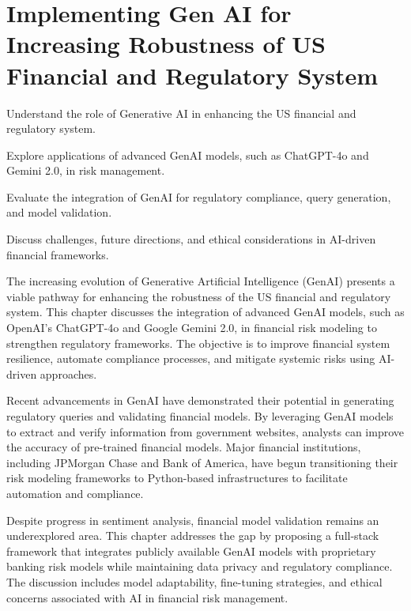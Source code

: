 \documentclass[a4paper,headinclude=on,footinclude=on,12pt,oneside]{scrbook}
\begin{document}
	
	\chapter{Implementing Gen AI for Increasing Robustness of US Financial and Regulatory System}
	
	\begin{arrows}
		\item Understand the role of Generative AI in enhancing the US financial and regulatory system.
		\item Explore applications of advanced GenAI models, such as ChatGPT-4o and Gemini 2.0, in risk management.
		\item Evaluate the integration of GenAI for regulatory compliance, query generation, and model validation.
		\item Discuss challenges, future directions, and ethical considerations in AI-driven financial frameworks.
	\end{arrows}
	
	The increasing evolution of Generative Artificial Intelligence (GenAI) presents a viable pathway for enhancing the robustness of the US financial and regulatory system. This chapter discusses the integration of advanced GenAI models, such as OpenAI’s ChatGPT-4o and Google Gemini 2.0, in financial risk modeling to strengthen regulatory frameworks. The objective is to improve financial system resilience, automate compliance processes, and mitigate systemic risks using AI-driven approaches.
	
	Recent advancements in GenAI have demonstrated their potential in generating regulatory queries and validating financial models. By leveraging GenAI models to extract and verify information from government websites, analysts can improve the accuracy of pre-trained financial models. Major financial institutions, including JPMorgan Chase and Bank of America, have begun transitioning their risk modeling frameworks to Python-based infrastructures to facilitate automation and compliance.
	
	Despite progress in sentiment analysis, financial model validation remains an underexplored area. This chapter addresses the gap by proposing a full-stack framework that integrates publicly available GenAI models with proprietary banking risk models while maintaining data privacy and regulatory compliance. The discussion includes model adaptability, fine-tuning strategies, and ethical concerns associated with AI in financial risk management.
	
\end{document}
